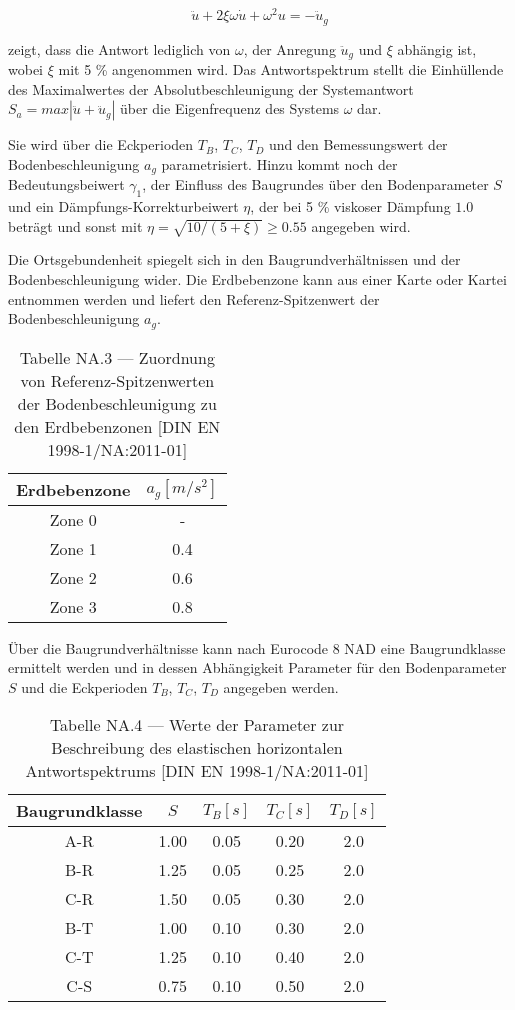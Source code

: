 \begin{equation} \label{ems_aws_umf}
\ddot u + 2\xi\omega \dot u + \omega^2 u = - \ddot u_g
\end{equation}

zeigt, dass die Antwort lediglich von $\omega$, der Anregung $\ddot u_g$ und $\xi$ abhängig ist, wobei $\xi$ mit 5 \% angenommen wird.
Das Antwortspektrum stellt die Einhüllende des Maximalwertes der Absolutbeschleunigung der Systemantwort $S_a=max|\ddot u + \ddot u_g|$ über die Eigenfrequenz des Systems $\omega$ dar. \cite{Bachmann}

Sie wird über die Eckperioden $T_B$, $T_C$, $T_D$ und den Bemessungswert der Bodenbeschleunigung $a_g$ parametrisiert. Hinzu kommt noch der Bedeutungsbeiwert $\gamma_1$, der Einfluss des Baugrundes über den Bodenparameter $S$ und ein Dämpfungs-Korrekturbeiwert $\eta$, der bei 5 \% viskoser Dämpfung $1.0$ beträgt und sonst mit $\eta=\sqrt{10/(5+\xi)}\geq 0.55$ angegeben wird.

\pagebreak

Die Ortsgebundenheit spiegelt sich in den Baugrundverhältnissen und der Bodenbeschleunigung wider. Die Erdbebenzone kann aus einer Karte oder Kartei entnommen werden und liefert den Referenz-Spitzenwert der Bodenbeschleunigung $a_g$.

\begin{table}[H]
\centering
\begin{tabular}{ |c|c| } 
 \hline
 Erdbebenzone & $a_g [m/s^2]$ \\
 \hline\hline
 Zone 0 & - \\ 
 Zone 1 & 0.4 \\ 
 Zone 2 & 0.6 \\ 
 Zone 3 & 0.8 \\ 
 \hline
\end{tabular}
\caption{Tabelle NA.3 — Zuordnung von Referenz-Spitzenwerten der Bodenbeschleunigung zu den Erdbebenzonen [DIN EN 1998-1/NA:2011-01]}
\end{table}

Über die Baugrundverhältnisse kann nach Eurocode 8 NAD eine Baugrundklasse ermittelt werden und in dessen Abhängigkeit Parameter für den Bodenparameter $S$ und die Eckperioden $T_B$, $T_C$, $T_D$ angegeben werden.

\begin{table}[H]
\centering
\begin{tabular}{ |c|c|c|c|c| } 
 \hline
 Baugrundklasse & $S$ & $T_B [s]$ & $T_C [s]$ & $T_D [s]$\\
 \hline\hline
 A-R  & 1.00 & 0.05 & 0.20 & 2.0\\ 
 B-R  & 1.25 & 0.05 & 0.25 & 2.0\\ 
 C-R  & 1.50 & 0.05 & 0.30 & 2.0\\ 
 \hline
 B-T  & 1.00 & 0.10 & 0.30 & 2.0\\
 C-T  & 1.25 & 0.10 & 0.40 & 2.0\\
 \hline
 C-S  & 0.75 & 0.10 & 0.50 & 2.0\\
 \hline
\end{tabular}
\caption{Tabelle NA.4 — Werte der Parameter zur Beschreibung des elastischen horizontalen Antwortspektrums [DIN EN 1998-1/NA:2011-01]}
\end{table}

